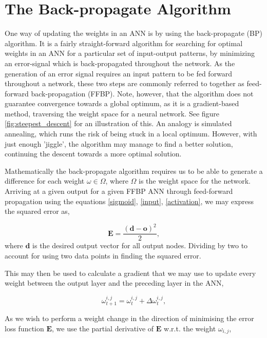 \section{The Back-propagate Algorithm}\label{BP}

One way of updating the weights in an ANN is by using the back-propagate (BP) algorithm. It is a fairly straight-forward algorithm for searching for optimal weights in an ANN for a particular set of input-output patterns, by minimizing an error-signal which is back-propagated throughout the network. As the generation of an error signal requires an input pattern to be fed forward throughout a network, these two steps are commonly referred to together as feed-forward back-propagation (FFBP). Note, however, that the algorithm does not guarantee convergence towards a global optimum, as it is a gradient-based method, traversing the weight space for a neural network. See figure \ref{fig:steepest_descent} for an illustration of this. An analogy is simulated annealing, which runs the risk of being stuck in a local optimum. However, with just enough 'jiggle', the algorithm may manage to find a better solution, continuing the descent towards a more optimal solution.

Mathematically the back-propagate algorithm requires us to be able to generate a difference for each weight $\omega \in \Omega$, where $\Omega$ is the weight space for the network. Arriving at a given output for a given FFBP ANN through feed-forward propagation using the equations \eqref{sigmoid}, \eqref{input}, \eqref{activation}, we may express the squared error as,

\begin{equation}
    \textbf{E} = \frac{(\textbf{d} - \textbf{o})^2}{2},
\end{equation}
where $\textbf{d}$ is the desired output vector for all output nodes. Dividing by two to account for using two data points in finding the squared error.

This may then be used to calculate a gradient that we may use to update every weight between the output layer and the preceding layer in the ANN,

\begin{equation}\label{weight_update}
    \omega_{t+1}^{i,j} = \omega_{t}^{i,j} + \Delta \omega_{t}^{i,j},
\end{equation}

As we wish to perform a weight change in the direction of minimising the error loss function $\textbf{E}$, we use the partial derivative of $\textbf{E}$ w.r.t. the weight $\omega_{i,j}$,

